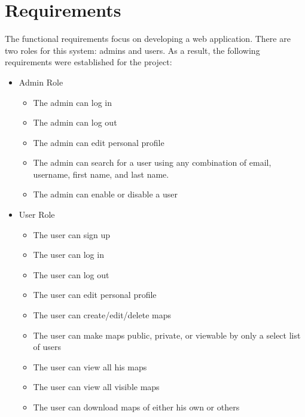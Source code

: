 \section{Requirements}
\label{sec:Requirements}

The functional requirements focus on developing a web application. There are two roles for this system: admins and users. As a result, the following requirements were established for the project:
\begin{itemize}
  \item Admin Role
  \begin{itemize}
    \item The admin can log in
    \item The admin can log out
    \item The admin can edit personal profile
    \item The admin can search for a user using any combination of email, username, first name, and last name.
    \item The admin can enable or disable a user
  \end{itemize}
  \item User Role
  \begin{itemize}
    \item The user can sign up
    \item The user can log in
    \item The user can log out
    \item The user can edit personal profile
    \item The user can create/edit/delete maps
    \item The user can make maps public, private, or viewable by only a select list of users
    \item The user can view all his maps
    \item The user can view all visible maps
    \item The user can download maps of either his own or others
  \end{itemize}
\end{itemize}
